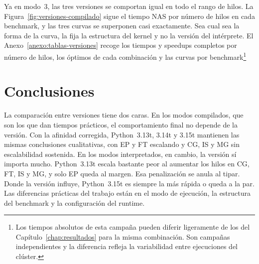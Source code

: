 Ya en modo~3, las tres versiones se comportan igual en todo el rango de hilos. La
Figura~\ref{fig:versiones-compilado} sigue el tiempo NAS por número de hilos en
cada benchmark, y las tres curvas se superponen casi exactamente. Sea cual sea la
forma de la curva, la fija la estructura del kernel y no la versión del
intérprete. El Anexo~\ref{anexo:tablas-versiones} recoge los tiempos y speedups
completos por número de hilos, los óptimos de cada combinación y las curvas por
benchmark\footnote{Los tiempos absolutos de esta campaña pueden
diferir ligeramente de los del Capítulo~\ref{chap:resultados} para la misma
combinación. Son campañas independientes y la diferencia refleja la variabilidad
entre ejecuciones del clúster.}


\newpage
\section{Conclusiones}
\label{sec:versiones-conclusiones}

La comparación entre versiones tiene dos caras. En los modos compilados, que son
los que dan tiempos prácticos, el comportamiento final no depende de la versión.
Con la afinidad corregida, Python~3.13t, 3.14t y 3.15t mantienen las mismas
conclusiones cualitativas, con EP y FT escalando y CG, IS y MG sin escalabilidad
sostenida. En los modos interpretados, en cambio, la versión sí importa mucho.
Python~3.13t escala bastante peor al aumentar los hilos en CG, FT, IS y MG, y solo
EP queda al margen. Esa penalización se anula al tipar. Donde la versión influye,
Python~3.15t es siempre la más rápida o queda a la par. Las diferencias prácticas
del trabajo están en el modo de ejecución, la estructura del benchmark y la
configuración del runtime.
